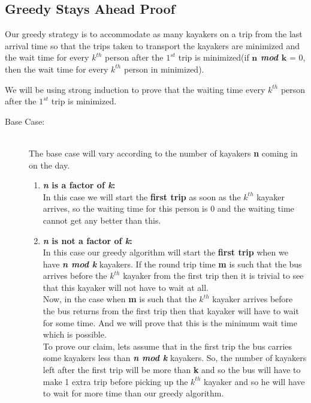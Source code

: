 \documentclass[8pt]{article}
\begin{document}
\subsection{Greedy Stays Ahead Proof}
Our greedy strategy is to accommodate as many kayakers on a trip from the last arrival time so that the trips taken to transport the kayakers are minimized and the wait time for every \textbf{\textit{$k^{th}$}} person after the $1^{st}$ trip is minimized(if \textbf{\textit{$\textbf{n}$ mod $\textbf{k}$}} = 0, then the wait time for every \textbf{\textit{$k^{th}$}} person in minimized).

We will be using strong induction to prove that the waiting time every \textbf{\textit{$k^{th}$}} person after the $1^{st}$ trip is minimized.

\begin{description}
    \item[Base Case: ] \hfill \\
The base case will vary according to the number of kayakers \textbf{n} coming in on the day.
    \begin{enumerate}
        \item{\textbf{\textit{n} is a factor of \textit{k}:}} \hfill \\
            In this case we will start the \textbf{first trip} as soon as the \textbf{\textit{$k^{th}$}} kayaker arrives, so the waiting time for this person is 0 and the waiting time cannot get any better than this. \\
        \item{\textbf{\textit{n} is not a factor of \textit{k}:} } \hfill \\
            In this case our greedy algorithm will start the \textbf{first trip} when we have \textbf{\textit{n mod k}} kayakers. If the round trip time \textbf{m} is such that the bus arrives before the \textbf{\textit{$k^{th}$}} kayaker from the first trip then it is trivial to see that this kayaker will not have to wait at all. \\

            Now, in the case when \textbf{m} is such that the \textbf{\textit{$k^{th}$}} kayaker arrives before the bus returns from the first trip then that kayaker will have to wait for some time. And we will prove that this is the minimum wait time which is possible. \\
            
            To prove our claim, lets assume that in the first trip the bus carries some kayakers less than \textbf{\textit{n mod k}} kayakers. So, the number of kayakers left after the first trip will be more than \textbf{k} and so the bus will have to make 1 extra trip before picking up the \textbf{\textit{$k^{th}$}} kayaker and so he will have to wait for more time than our greedy algorithm.\\


\end{enumerate}
\end{description}
\end{document}
